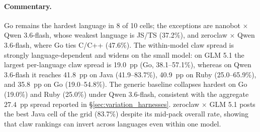 \documentclass{llmxive}
\begin{document}
\paragraph{Commentary.}
Go remains the hardest language in 8 of 10 cells; the exceptions are
nanobot $\times$ Qwen 3.6-flash, whose weakest language is JS/TS (37.2\%), and
zeroclaw $\times$ Qwen 3.6-flash, where Go ties C/C++ (47.6\%). The
within-model claw spread is strongly language-dependent and widens on the small
model: on GLM 5.1 the largest per-language claw spread is 19.0~pp (Go,
38.1--57.1\%), whereas on Qwen 3.6-flash it reaches 41.8~pp on Java
(41.9--83.7\%), 40.9~pp on Ruby (25.0--65.9\%), and 35.8~pp on Go
(19.0--54.8\%). The generic baseline collapses hardest on Go (19.0\%) and Ruby
(25.0\%) under Qwen 3.6-flash, consistent with the aggregate $27.4$~pp spread
reported in \S\ref{sec:variation_harnesses}. zeroclaw $\times$ GLM 5.1 posts
the best Java cell of the grid (83.7\%) despite its mid-pack overall rate,
showing that claw rankings can invert across languages even within one model.


\end{document}
